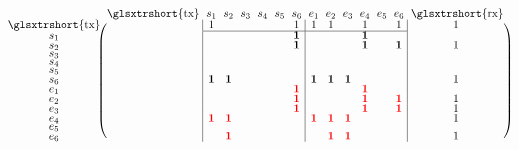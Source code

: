 \begin{figure}
  \centering
  \begin{equation*}
    \renewcommand{\arraystretch}{.6}
    \makeatletter\setlength\BA@colsep{3pt}\makeatother
    \begin{blockarray}{ccccccccccccccc}
      & \text{\glsxtrshort{tx}} & s_1 & s_2 & s_3 & s_4 & s_5 & s_6 & e_1 & e_2 & e_3 & e_4 & e_5 & e_6 & \text{\glsxtrshort{rx}}\\
      \begin{block}{c(>{\medspace}c|cccccc|cccccc|c<{\medspace})}
        \text{\glsxtrshort{tx}} & {} & 1 & {} & {} & {} & {} & 1 & 1 & 1 & {} & 1 & {} & 1 & 1\\
        \BAhhline{~~------------~}
        s_1 & {} & {} & {} & {} & {} & {} & \bsit{1} & {} & {} & {} & \bsit{1} & {} & & {} & {}\\ %
        s_2 & {} & {} & {} & {} & {} & {} & \bsit{1} & {} & {} & {} & \bsit{1} & {} & \bsit{1} & 1\\ %
        s_3 & {} & {} & {} & {} & {} & {} & {} & {} & {} & {} & {} & {} & {} & {}\\ %
        s_4 & {} & {} & {} & {} & {} & {} & {} & {} & {} & {} & {} & {} & {} & {}\\ %
        s_5 & {} & {} & {} & {} & {} & {} & {} & {} & {} & {} & {} & {} & {} & {}\\ %
        s_6 & {} & \bsit{1} & \bsit{1} & {} & {} & {} & {} & \bsit{1} & \bsit{1} & \bsit{1} & {} & {} & {} & 1\\ %
        e_1 & {} & {} & {} & {} & {} & {} & \bsit{\color{red}1} & {} & {} & {} & \bsit{\color{red}1} & {} & {} & {}\\ %
        e_2 & {} & {} & {} & {} & {} & {} & \bsit{\color{red}1} & {} & {} & {} & \bsit{\color{red}1} & {} & \bsit{\color{red}1} & 1\\ %
        e_3 & {} & {} & {} & {} & {} & {} & \bsit{\color{red}1} & {} & {} & {} & \bsit{\color{red}1} & {} & \bsit{\color{red}1} & 1\\ %
        e_4 & {} & \bsit{\color{red}1} & \bsit{\color{red}1} & {} & {} & {} & {} & \bsit{\color{red}1} & \bsit{\color{red}1} & \bsit{\color{red}1} & {} & {} & {} & 1 \\ %
        e_5 & {} & {} & {} & {} & {} & {} & {} & {} & {} & {} & {} & {} & {} & {}\\ %
        e_6 & {} & {} & \bsit{\color{red}1} & {} & {} & {} & {} & {} & \bsit{\color{red}1} & \bsit{\color{red}1} & {} & {} & {} & 1\\

\end{block}
\end{blockarray}
\end{equation*}
\end{figure}
